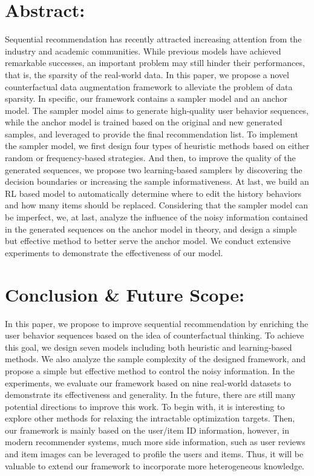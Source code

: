 \documentclass[]{report}
\begin{document}
	\section*{Abstract:}
	Sequential recommendation has recently attracted increasing attention from the industry and academic communities. While previous models have achieved remarkable successes, an important problem may still hinder their performances, that is, the sparsity of the real-world data. In this paper, we propose a novel counterfactual data augmentation framework to alleviate the problem of data sparsity. In specific, our framework contains a sampler model and an anchor model. The sampler model aims to generate high-quality user behavior sequences, while the anchor model is trained based on the original and new generated samples, and leveraged to provide the final recommendation list. To implement the sampler model, we first design four types of heuristic methods based on either random or frequency-based strategies. And then, to improve the quality of the generated sequences, we propose two learning-based samplers by discovering the decision boundaries or increasing the sample informativeness. At last, we build an RL based model to automatically determine where to edit the history behaviors and how many items should be replaced. Considering that the sampler model can be imperfect, we, at last, analyze the influence of the noisy information contained in the generated sequences on the anchor	model in theory, and design a simple but effective method to better serve the anchor model. We conduct extensive experiments to demonstrate the effectiveness of our model.
	
	\section*{Conclusion \& Future Scope:}
	In this paper, we propose to improve sequential recommendation by enriching the user behavior sequences based on the idea of counterfactual thinking. To achieve this goal, we design seven models including both heuristic and learning-based methods. We also analyze the sample complexity of the designed framework, and propose a simple but effective method to control the noisy information. In the experiments, we evaluate our framework based on nine real-world datasets to demonstrate its effectiveness and generality. In the future, there are still many potential directions to improve 	this work. To begin with, it is interesting to explore other methods for relaxing the intractable optimization targets. Then, our framework is mainly based on the user/item ID information, however, in modern recommender systems, much more side information, such as user reviews and item images can be leveraged to profile the users and items. Thus, it will be valuable to extend our framework to incorporate more heterogeneous knowledge.
	
\end{document}

